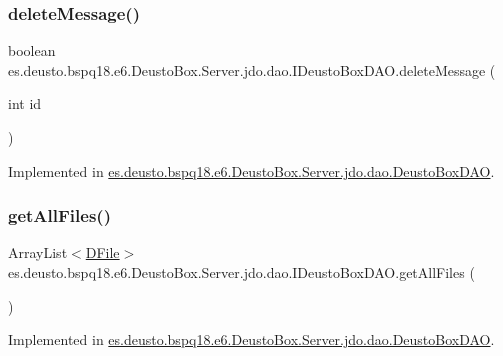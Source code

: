 \subsubsection{\texorpdfstring{delete\+Message()}{deleteMessage()}}
{\footnotesize\ttfamily boolean es.\+deusto.\+bspq18.\+e6.\+Deusto\+Box.\+Server.\+jdo.\+dao.\+I\+Deusto\+Box\+D\+A\+O.\+delete\+Message (\begin{DoxyParamCaption}\item[{int}]{id }\end{DoxyParamCaption})}



Implemented in \mbox{\hyperlink{classes_1_1deusto_1_1bspq18_1_1e6_1_1_deusto_box_1_1_server_1_1jdo_1_1dao_1_1_deusto_box_d_a_o_a4e42b41382683d87b32810a60080c8d0}{es.\+deusto.\+bspq18.\+e6.\+Deusto\+Box.\+Server.\+jdo.\+dao.\+Deusto\+Box\+D\+AO}}.

\mbox{\label{interfacees_1_1deusto_1_1bspq18_1_1e6_1_1_deusto_box_1_1_server_1_1jdo_1_1dao_1_1_i_deusto_box_d_a_o_a1b64a2f73f852c4bc0cf63f97c71914f}} 
\subsubsection{\texorpdfstring{get\+All\+Files()}{getAllFiles()}}
{\footnotesize\ttfamily Array\+List$<$\mbox{\hyperlink{classes_1_1deusto_1_1bspq18_1_1e6_1_1_deusto_box_1_1_server_1_1jdo_1_1data_1_1_d_file}{D\+File}}$>$ es.\+deusto.\+bspq18.\+e6.\+Deusto\+Box.\+Server.\+jdo.\+dao.\+I\+Deusto\+Box\+D\+A\+O.\+get\+All\+Files (\begin{DoxyParamCaption}{ }\end{DoxyParamCaption})}



Implemented in \mbox{\hyperlink{classes_1_1deusto_1_1bspq18_1_1e6_1_1_deusto_box_1_1_server_1_1jdo_1_1dao_1_1_deusto_box_d_a_o_afe1ece43464200c0c300f3eac92d728e}{es.\+deusto.\+bspq18.\+e6.\+Deusto\+Box.\+Server.\+jdo.\+dao.\+Deusto\+Box\+D\+AO}}.

